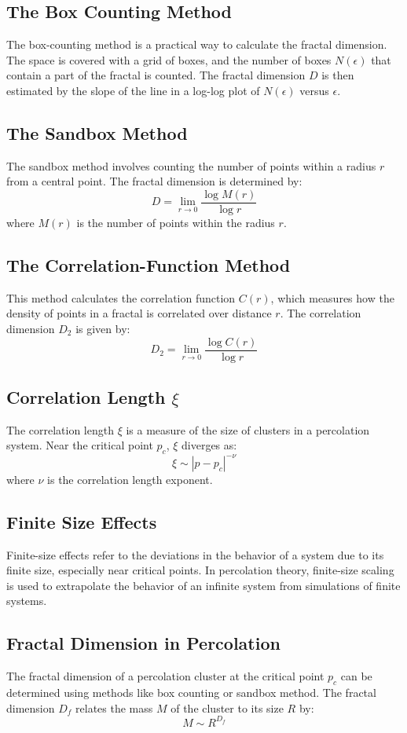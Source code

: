 \documentclass[12pt]{article}
\begin{document}
\subsection{The Box Counting Method}
The box-counting method is a practical way to calculate the fractal dimension. The space is covered with a grid of boxes, and the number of boxes \( N(\epsilon) \) that contain a part of the fractal is counted. The fractal dimension \( D \) is then estimated by the slope of the line in a log-log plot of \( N(\epsilon) \) versus \( \epsilon \).

\subsection{The Sandbox Method}
The sandbox method involves counting the number of points within a radius \( r \) from a central point. The fractal dimension is determined by:
\[
D = \lim_{r \to 0} \frac{\log M(r)}{\log r}
\]
where \( M(r) \) is the number of points within the radius \( r \).

\subsection{The Correlation-Function Method}
This method calculates the correlation function \( C(r) \), which measures how the density of points in a fractal is correlated over distance \( r \). The correlation dimension \( D_2 \) is given by:
\[
D_2 = \lim_{r \to 0} \frac{\log C(r)}{\log r}
\]

\subsection{Correlation Length \( \xi \)}
The correlation length \( \xi \) is a measure of the size of clusters in a percolation system. Near the critical point \( p_c \), \( \xi \) diverges as:
\[
\xi \sim |p - p_c|^{-\nu}
\]
where \( \nu \) is the correlation length exponent.

\subsection{Finite Size Effects}
Finite-size effects refer to the deviations in the behavior of a system due to its finite size, especially near critical points. In percolation theory, finite-size scaling is used to extrapolate the behavior of an infinite system from simulations of finite systems.

\subsection{Fractal Dimension in Percolation}
The fractal dimension of a percolation cluster at the critical point \( p_c \) can be determined using methods like box counting or sandbox method. The fractal dimension \( D_f \) relates the mass \( M \) of the cluster to its size \( R \) by:
\[
M \sim R^{D_f}
\]
\end{document}

